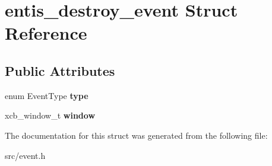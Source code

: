 \hypertarget{structentis__destroy__event}{}\section{entis\+\_\+destroy\+\_\+event Struct Reference}
\label{structentis__destroy__event}
\subsection*{Public Attributes}
\begin{DoxyCompactItemize}
\item 
\mbox{\label{structentis__destroy__event_a4992cf39b7aea2ff76d0d7c84fd98316}} 
enum Event\+Type {\bfseries type}
\item 
\mbox{\label{structentis__destroy__event_a151cbbeff38dcf3826ac946aecb274b1}} 
xcb\+\_\+window\+\_\+t {\bfseries window}
\end{DoxyCompactItemize}


The documentation for this struct was generated from the following file\+:\begin{DoxyCompactItemize}
\item 
src/event.\+h\end{DoxyCompactItemize}

